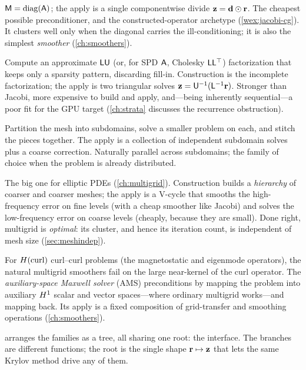 \begin{description}[style=nextline,leftmargin=1.5em]
  \item[Diagonal / Jacobi.] $\mathsf{M}=\operatorname{diag}(\mathsf{A})$; the apply is a single
  componentwise divide $\mathbf{z}=\mathbf{d}\odot\mathbf{r}$. The cheapest possible preconditioner, and
  the constructed-operator archetype (\cref{wex:jacobi-cg}). It clusters well only when the
  diagonal carries the ill-conditioning; it is also the simplest \emph{smoother}
  (\cref{ch:smoothers}).
  \item[Incomplete factorizations (ILU / IC).] Compute an approximate $\mathsf{L}\mathsf{U}$ (or,
  for SPD $\mathsf{A}$, Cholesky $\mathsf{L}\mathsf{L}^{\top}$) factorization that keeps only a
  sparsity pattern, discarding fill-in. Construction is the incomplete factorization; the
  apply is two triangular solves $\mathbf{z}=\mathsf{U}^{-1}(\mathsf{L}^{-1}\mathbf{r})$. Stronger than Jacobi,
  more expensive to build and apply, and---being inherently sequential---a poor fit for the
  GPU target (\cref{ch:strata} discusses the recurrence obstruction).
  \item[Domain decomposition.] Partition the mesh into subdomains, solve a smaller problem on
  each, and stitch the pieces together. The apply is a collection of independent subdomain
  solves plus a coarse correction. Naturally parallel across subdomains; the family of choice
  when the problem is already distributed.
  \item[Multigrid.] The big one for elliptic PDEs (\cref{ch:multigrid}). Construction builds a
  \emph{hierarchy} of coarser and coarser meshes; the apply is a V-cycle that smooths the
  high-frequency error on fine levels (with a cheap smoother like Jacobi) and solves the
  low-frequency error on coarse levels (cheaply, because they are small). Done right, multigrid
  is \emph{optimal}: its cluster, and hence its iteration count, is independent of mesh size
  (\cref{sec:meshindep}).
  \item[Auxiliary-space / AMS.] For $H(\mathrm{curl})$ curl--curl problems (the magnetostatic and
  eigenmode operators), the natural multigrid smoothers fail on the large near-kernel of the
  curl operator. The \emph{auxiliary-space Maxwell solver} (AMS) preconditions by mapping the
  problem into auxiliary $H^1$ scalar and vector spaces---where ordinary multigrid works---and
  mapping back. Its apply is a fixed composition of grid-transfer and smoothing operations
  (\cref{ch:smoothers}).
\end{description}

 arranges the families as a tree, all sharing one root: the
 interface. The branches are different functions; the root is the single shape
$\mathbf{r}\mapsto\mathbf{z}$ that lets the same Krylov method drive any of them.

